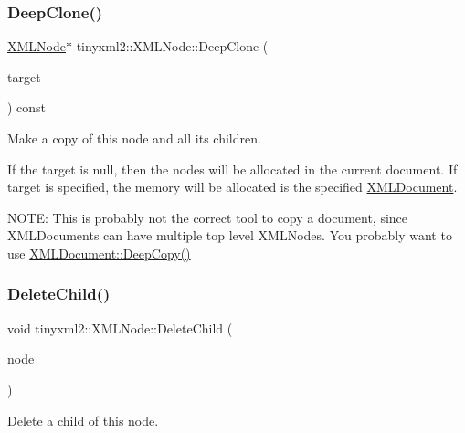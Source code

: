 \mbox{\label{classtinyxml2_1_1XMLNode_a62c71b6bf8734b5424063b8d9a61c266}} 
\subsubsection{\texorpdfstring{DeepClone()}{DeepClone()}}
{\footnotesize\ttfamily \mbox{\hyperlink{classtinyxml2_1_1XMLNode}{X\+M\+L\+Node}}$\ast$ tinyxml2\+::\+X\+M\+L\+Node\+::\+Deep\+Clone (\begin{DoxyParamCaption}\item[{\mbox{\hyperlink{classtinyxml2_1_1XMLDocument}{X\+M\+L\+Document}} $\ast$}]{target }\end{DoxyParamCaption}) const}

Make a copy of this node and all its children.

If the \textquotesingle{}target\textquotesingle{} is null, then the nodes will be allocated in the current document. If \textquotesingle{}target\textquotesingle{} is specified, the memory will be allocated is the specified \mbox{\hyperlink{classtinyxml2_1_1XMLDocument}{X\+M\+L\+Document}}.

N\+O\+TE\+: This is probably not the correct tool to copy a document, since X\+M\+L\+Documents can have multiple top level X\+M\+L\+Nodes. You probably want to use \mbox{\hyperlink{classtinyxml2_1_1XMLDocument_af592ffc91514e25a39664521ac83db45}{X\+M\+L\+Document\+::\+Deep\+Copy()}} \mbox{\label{classtinyxml2_1_1XMLNode_a363b6edbd6ebd55f8387d2b89f2b0921}} 
\subsubsection{\texorpdfstring{DeleteChild()}{DeleteChild()}}
{\footnotesize\ttfamily void tinyxml2\+::\+X\+M\+L\+Node\+::\+Delete\+Child (\begin{DoxyParamCaption}\item[{\mbox{\hyperlink{classtinyxml2_1_1XMLNode}{X\+M\+L\+Node}} $\ast$}]{node }\end{DoxyParamCaption})}

Delete a child of this node. \mbox{\label{classtinyxml2_1_1XMLNode_a0360085cc54df5bff85d5c5da13afdce}} 
